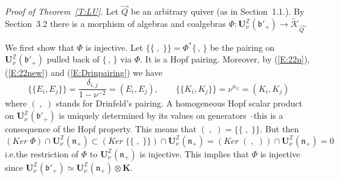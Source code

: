 \documentclass[a4paper,10pt]{amsart}
\def\Z{\mathbb{Z}}
\def\U{\mathbf{U}}
\def\bo{\mathfrak{b}}
\def\n{\mathfrak{n}}
\numberwithin{equation}{section}
\begin{document}
\vspace{.1in}

\noindent
\textit{Proof of Theorem~\ref{T:LU}.} Let $\vec{Q}$ be an arbitrary quiver (as in Section~1.1.).  By Section~3.2 there is a morphism of algebras and coalgebras $\Phi: \U^{\Z}_{\nu}(\bo'_+) \to \widetilde{\mathcal{K}}_{\vec{Q}}$. 

We first show that $\Phi$ is injective. Let $\{\{\;,\;\}\}=\Phi^* \{\,,\,\}$ be the pairing on $\U^{\Z}_{\nu}(\bo'_+)$ pulled back of $\{\,,\,\}$ via $\Phi$. It is a Hopf pairing. Moreover, by (\ref{E:22n}), (\ref{E:22new}) and (\ref{E:Drinpairing}) we have
$$\{\{E_i,E_j\}\}=\frac{\delta_{i,j}}{1-\nu^{-2}}=(E_i,E_j), \qquad \{\{ K_i,K_j\}\}=\nu^{a_{ij}}=(K_i,K_j)$$
where $(\;,\;)$ stands for Drinfeld's pairing. A homogeneous Hopf scalar product on $\U^{\Z}_{\nu}(\bo'_+) $ is uniquely determined by its values on generators --this is a consequence of the Hopf property. This means that $(\;,\;)=\{\{\;,\;\}\}$. But then 
$$(Ker\;\Phi) \cap \U^{\Z}_{\nu}(\n_+) \subset (Ker\;\{\{\;,\;\}\}) \cap \U^{\Z}_{\nu}(\n_+)=(Ker\;(\;,\;)) \cap \U^{\Z}_{\nu}(\n_+)=0$$
i.e.the restriction of $\Phi$ to $\U^{\Z}_{\nu}(\n_+)$ is injective. This implies that $\Phi$ is injective since $\U^{\Z}_{\nu}(\bo'_+)\simeq \U^{\Z}_{\nu}(\n_+) \otimes \mathbf{K}$.
\end{document}
